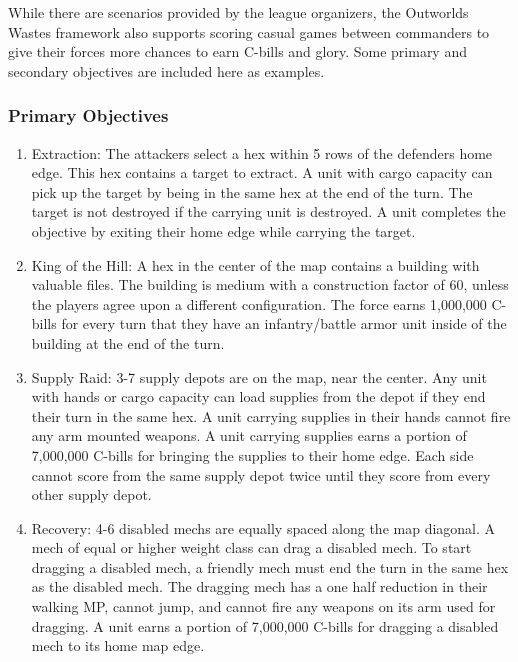 \documentclass[UTF8]{article}
\begin{document}
While there are scenarios provided by the league organizers, the Outworlds Wastes framework also supports scoring casual games between commanders to give their forces more chances to earn C-bills and glory.
Some primary and secondary objectives are included here as examples.\\

\subsubsection{Primary Objectives}

\begin{enumerate}

\item Extraction: The attackers select a hex within 5 rows of the defenders home edge.
This hex contains a target to extract.
A unit with cargo capacity can pick up the target by being in the same hex at the end of the turn.
The target is not destroyed if the carrying unit is destroyed.
A unit completes the objective by exiting their home edge while carrying the target.

\item King of the Hill: A hex in the center of the map contains a building with valuable files.
The building is medium with a construction factor of 60, unless the players agree upon a different configuration.
The force earns 1,000,000 C-bills for every turn that they have an infantry/battle armor unit inside of the building at the end of the turn.

\item Supply Raid: 3-7 supply depots are on the map, near the center.
Any unit with hands or cargo capacity can load supplies from the depot if they end their turn in the same hex.
A unit carrying supplies in their hands cannot fire any arm mounted weapons.
A unit carrying supplies earns a portion of 7,000,000 C-bills for bringing the supplies to their home edge.
Each side cannot score from the same supply depot twice until they score from every other supply depot.

\item Recovery: 4-6 disabled mechs are equally spaced along the map diagonal.
A mech of equal or higher weight class can drag a disabled mech.
To start dragging a disabled mech, a friendly mech must end the turn in the same hex as the disabled mech.
The dragging mech has a one half reduction in their walking MP, cannot jump, and cannot fire any weapons on its arm used for dragging.
A unit earns a portion of 7,000,000 C-bills for dragging a disabled mech to its home map edge.


\end{enumerate}
\end{document}
